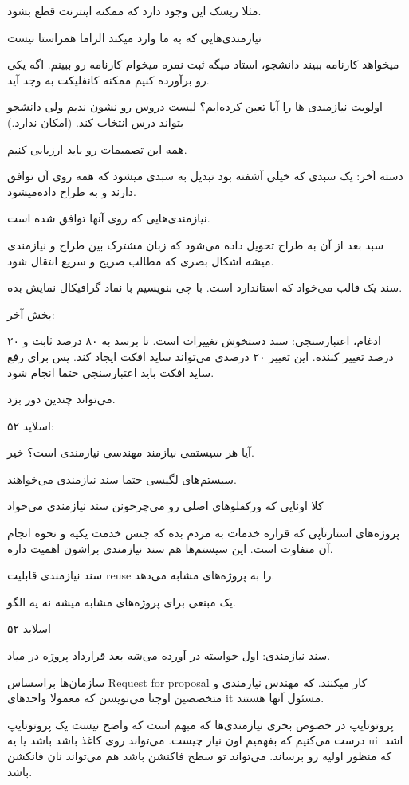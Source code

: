 مثلا ریسک این وجود دارد که ممکنه اینترنت قطع بشود.

نیازمندی‌هایی که به ما وارد میکند الزاما همراستا نیست

میخواهد کارنامه ببیند دانشجو، استاد میگه ثبت نمره میخوام کارنامه رو ببینم. 
اگه یکی رو برآورده کنیم ممکنه کانفلیکت به وجد آید.

اولویت نیازمندی ها را آیا تعین کرده‌ایم؟ لیست دروس رو نشون ندیم ولی دانشجو
بتواند درس انتخاب کند. (امکان ندارد.)

همه این تصمیمات رو باید ارزیابی کنیم.

دسته آخر: یک سبدی که خیلی آشفته بود تبدیل به سبدی میشود که همه روی آن توافق
دارند و به طراح داده‌میشود.

نیازمندی‌هایی که روی آنها توافق شده است.

سبد بعد از آن به طراح تحویل داده می‌شود که زبان مشترک بین طراح و نیازمندی میشه
اشکال بصری که مطالب صریح و سریع انتقال شود.

سند یک قالب می‌خواد که استاندارد است. با چی بنویسیم با نماد گرافیکال نمایش بده.

بخش آخر:

ادغام، اعتبارسنجی:
سبد دستخوش تغییرات است. تا برسد به ۸۰ درصد ثابت و ۲۰ درصد تغییر کننده. این تغییر
۲۰ درصدی می‌تواند ساید افکت ایجاد کند. پس برای رفع ساید افکت باید اعتبارسنجی
حتما انجام شود.

می‌تواند چندین دور بزد.

اسلاید ۵۲:

آیا هر سیستمی نیازمند مهندسی نیازمندی است؟ خیر. 

سیستم‌های لگیسی حتما سند نیازمندی می‌خواهند. 

کلا اونایی که ورکفلو‌های اصلی رو می‌چرخونن سند نیازمندی می‌خواد

پروژه‌های استارتآپی که قراره خدمات به مردم بده که جنس خدمت یکیه و نحوه انجام آن
متفاوت است. این سیستم‌ها هم سند نیازمندی براشون اهمیت داره.

سند نیازمندی قابلیت reuse را به پروژه‌های مشابه می‌دهد.

یک مبنعی برای پروژه‌های مشابه میشه نه یه الگو.

اسلاید ۵۲

سند نیازمندی: اول خواسته در آورده می‌شه بعد قرارداد پروژه در میاد.

سازمان‌ها براسساس Request for proposal کار میکنند. که مهندس نیازمندی و متخصصین
اوجنا می‌نویسن که معمولا واحد‌های it مسئول آنها هستند.

پروتوتایپ در خصوص بخری نیازمندی‌ها که مبهم است که واضح نیست یک پروتوتایپ درست
می‌کنیم که بفهمیم اون نیاز چیست. می‌تواند روی کاغذ باشد باشد یا یه ui اشد. که
منظور اولیه رو برساند. می‌تواند تو سطح فاکنشن باشد هم می‌تواند نان فانکشن باشد.


